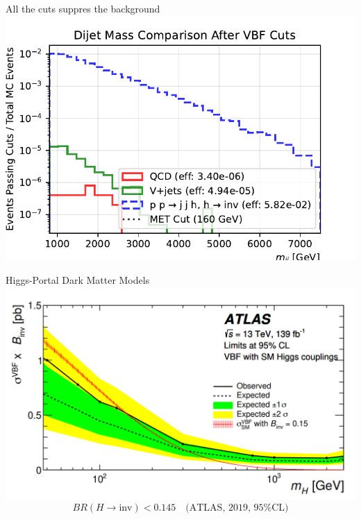 \documentclass{../../bredelebeamer}
\begin{document}
\begin{frame}{All the cuts suppres the background}
    \includegraphics[width=.95\textwidth]{../Images/met_comparison_after_vbf_cuts.pdf}
\end{frame}

\begin{frame}{Higgs-Portal Dark Matter Models}
    \includegraphics[width=\textwidth]{../Images/Altas_Result.png}
    $$
        BR(H \to \text{inv}) < 0.145 \quad \text{(ATLAS, 2019, 95\% CL)}
    $$
\end{frame}
\end{document}
